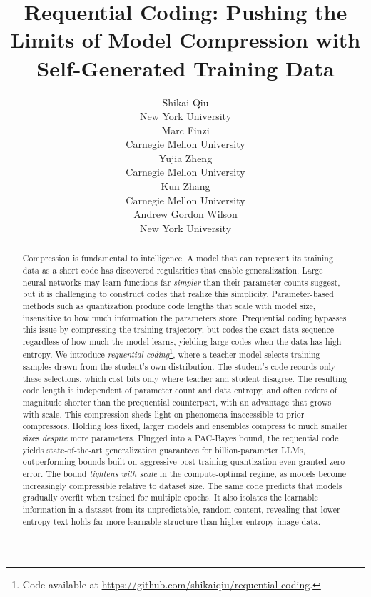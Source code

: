 \documentclass{article}
\title{Requential Coding: Pushing the Limits of Model Compression with Self-Generated Training Data}
\author{%
  Shikai Qiu \\
  New York University \\
  \And
  Marc Finzi \\
  Carnegie Mellon University \\
  \And
  Yujia Zheng \\
  Carnegie Mellon University \\
  \And
  Kun Zhang \\
  Carnegie Mellon University \\
  \And
  Andrew Gordon Wilson \\
  New York University \\
}
\theoremstyle{plain}
\theoremstyle{definition}
\theoremstyle{remark}
\begin{document}
\maketitle


\begin{abstract}
%
%

%
%

Compression is fundamental to intelligence. A model that can represent its training data as a short code has discovered regularities that enable generalization. Large neural networks may learn functions far \emph{simpler} than their parameter counts suggest, but it is challenging to construct codes that realize this simplicity. Parameter-based methods such as quantization produce code lengths that scale with model size, insensitive to how much information the parameters store. Prequential coding bypasses this issue by compressing the training trajectory, but codes the exact data sequence regardless of how much the model learns, yielding large codes when the data has high entropy. We introduce \emph{requential coding}\renewcommand{\thefootnote}{$\dagger$}\footnote{Code available at \url{https://github.com/shikaiqiu/requential-coding}.}\setcounter{footnote}{0}\renewcommand{\thefootnote}{\arabic{footnote}}, where a teacher model selects training samples drawn from the student's own distribution. The student's code records only these selections, which cost bits only where teacher and student disagree. The resulting code length is independent of parameter count and data entropy, and often orders of magnitude shorter than the prequential counterpart, with an advantage that grows with scale. This compression sheds light on phenomena inaccessible to prior compressors. Holding loss fixed, larger models and ensembles compress to much smaller sizes \emph{despite} more parameters. Plugged into a PAC-Bayes bound, the requential code yields state-of-the-art generalization guarantees for billion-parameter LLMs, outperforming bounds built on aggressive post-training quantization even granted zero error. The bound \emph{tightens with scale} in the compute-optimal regime, as models become increasingly compressible relative to dataset size. The same code predicts that models gradually overfit when trained for multiple epochs. It also isolates the learnable information in a dataset from its unpredictable, random content, revealing that lower-entropy text holds far more learnable structure than higher-entropy image data.

%

%



%

%
%
\end{abstract}
\end{document}
